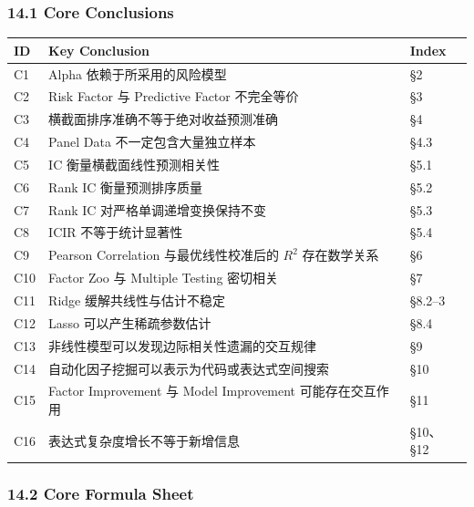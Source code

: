 \hypertarget{part-4-63-0001-core-conclusions}{%
\subsubsection{14.1 Core Conclusions}\label{part-4-63-0001-core-conclusions}}

\begin{readertable}
\begin{longtable}[]{@{}
  >{\raggedright\arraybackslash}p{}
  >{\raggedright\arraybackslash}p{}
  >{\raggedright\arraybackslash}p{}@{}}
\toprule
ID & Key Conclusion & Index \\
\midrule
\endhead
C1 & Alpha 依赖于所采用的风险模型 & §2 \\
C2 & Risk Factor 与 Predictive Factor 不完全等价 & §3 \\
C3 & 横截面排序准确不等于绝对收益预测准确 & §4 \\
C4 & Panel Data 不一定包含大量独立样本 & §4.3 \\
C5 & IC 衡量横截面线性预测相关性 & §5.1 \\
C6 & Rank IC 衡量预测排序质量 & §5.2 \\
C7 & Rank IC 对严格单调递增变换保持不变 & §5.3 \\
C8 & ICIR 不等于统计显著性 & §5.4 \\
C9 & Pearson Correlation 与最优线性校准后的 \(R^2\) 存在数学关系 & §6 \\
C10 & Factor Zoo 与 Multiple Testing 密切相关 & §7 \\
C11 & Ridge 缓解共线性与估计不稳定 & §8.2--3 \\
C12 & Lasso 可以产生稀疏参数估计 & §8.4 \\
C13 & 非线性模型可以发现边际相关性遗漏的交互规律 & §9 \\
C14 & 自动化因子挖掘可以表示为代码或表达式空间搜索 & §10 \\
C15 & Factor Improvement 与 Model Improvement 可能存在交互作用 & §11 \\
C16 & 表达式复杂度增长不等于新增信息 & §10、§12 \\
\bottomrule
\end{longtable}
\end{readertable}

\hypertarget{part-4-63-0001-core-formula-sheet}{%
\subsubsection{14.2 Core Formula Sheet}\label{part-4-63-0001-core-formula-sheet}}

